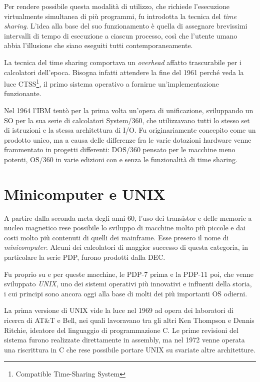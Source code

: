 \documentclass[12pt,a4paper]{report}
\begin{document}
		Per rendere possibile questa modalità di utilizzo, che richiede l'esecuzione virtualmente simultanea di
		più programmi, fu introdotta la tecnica del \emph{time sharing}. L'idea alla base del suo funzionamento
		è quella di assegnare brevissimi intervalli di tempo di esecuzione a ciascun processo, così che l'utente
		umano abbia l'illusione che siano eseguiti tutti contemporaneamente.
		
		La tecnica del time sharing comportava un \emph{overhead} affatto trascurabile per i calcolatori dell'epoca.
		Bisogna infatti attendere la fine del 1961 perché veda la luce CTSS\footnote{Compatible Time-Sharing System},
		il primo sistema operativo a fornirne un'implementazione funzionante.
		
		Nel 1964 l'IBM tentò per la prima volta un'opera di unificazione, sviluppando un SO per la sua serie di
		calcolatori System/360, che utilizzavano tutti lo stesso set di istruzioni e la stessa architettura di I/O.
		Fu originariamente concepito come un prodotto unico, ma a causa delle differenze fra le varie dotazioni hardware
		venne frammentato in progetti differenti: DOS/360 pensato per le macchine meno potenti, OS/360 in varie edizioni
		con e senza le funzionalità di time sharing.
		
	\section{Minicomputer e UNIX}
		A partire dalla seconda meta degli anni 60, l'uso dei transistor e delle memorie a nucleo magnetico rese
		possibile lo sviluppo di macchine molto più piccole e dai costi molto più contenuti di quelli dei mainframe.
		Esse presero il nome di \emph{minicomputer}. Alcuni dei calcolatori di maggior successo di questa categoria,
		in particolare la serie PDP, furono prodotti dalla DEC.
		
		Fu proprio su e per queste macchine, le PDP-7 prima e la PDP-11 poi, che venne sviluppato \emph{UNIX}, uno
		dei sistemi operativi più innovativi e influenti della storia, i cui principi sono ancora oggi alla base di
		molti dei più importanti OS odierni.
		
		La prima versione di UNIX vide la luce nel 1969 ad opera dei laboratori di ricerca di AT\&T e Bell, nei quali
		lavoravano tra gli altri Ken Thompson e Dennis Ritchie, ideatore del linguaggio di programmazione C.
		Le prime revisioni del sistema furono realizzate direttamente in assembly, ma nel 1972 venne operata
		una riscrittura in C che rese possibile portare UNIX su svariate altre architetture.
\end{document}
